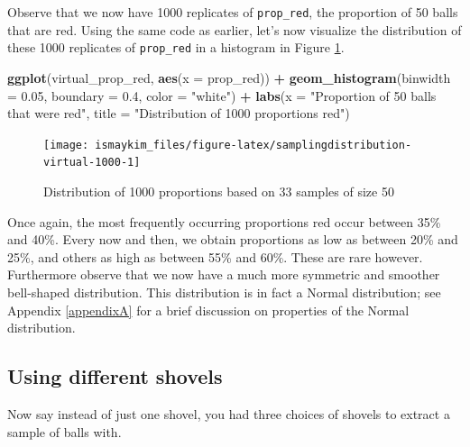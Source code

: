 \documentclass[12pt, krantz2,]{krantz}
\makeatletter
\newenvironment{Shaded}{\begin{snugshade}}{\end{snugshade}}
\newcommand{\DataTypeTok}[1]{\textcolor[rgb]{0.27,0.27,0.27}{#1}}
\newcommand{\FloatTok}[1]{\textcolor[rgb]{0.06,0.06,0.06}{#1}}
\newcommand{\KeywordTok}[1]{\textcolor[rgb]{0.27,0.27,0.27}{\textbf{#1}}}
\newcommand{\NormalTok}[1]{#1}
\newcommand{\OperatorTok}[1]{\textcolor[rgb]{0.43,0.43,0.43}{\textbf{#1}}}
\newcommand{\StringTok}[1]{\textcolor[rgb]{0.5,0.5,0.5}{#1}}
\newenvironment{kframe}{%
\medskip{}
\setlength{\fboxsep}{.8em}
 \def\at@end@of@kframe{}%
 \ifinner\ifhmode%
  \def\at@end@of@kframe{\end{minipage}}%
  \begin{minipage}{\columnwidth}%
 \fi\fi%
 \def\FrameCommand##1{\hskip\@totalleftmargin \hskip-\fboxsep
 \colorbox{shadecolor}{##1}\hskip-\fboxsep
     \hskip-\linewidth \hskip-\@totalleftmargin \hskip\columnwidth}%
 \MakeFramed {\advance\hsize-\width
   \@totalleftmargin\z@ \linewidth\hsize
   \@setminipage}}%
 {\par\unskip\endMakeFramed%
 \at@end@of@kframe}
\renewenvironment{Shaded}{\begin{kframe}}{\end{kframe}}
\makeatother
\begin{document}
Observe that we now have 1000 replicates of \texttt{prop\_red}, the proportion of 50 balls that are red. Using the same code as earlier, let's now visualize the distribution of these 1000 replicates of \texttt{prop\_red} in a histogram in Figure \ref{fig:samplingdistribution-virtual-1000}.

\begin{Shaded}
\begin{Highlighting}[]
\KeywordTok{ggplot}\NormalTok{(virtual_prop_red, }\KeywordTok{aes}\NormalTok{(}\DataTypeTok{x =}\NormalTok{ prop_red)) }\OperatorTok{+}
\StringTok{  }\KeywordTok{geom_histogram}\NormalTok{(}\DataTypeTok{binwidth =} \FloatTok{0.05}\NormalTok{, }\DataTypeTok{boundary =} \FloatTok{0.4}\NormalTok{, }\DataTypeTok{color =} \StringTok{"white"}\NormalTok{) }\OperatorTok{+}
\StringTok{  }\KeywordTok{labs}\NormalTok{(}\DataTypeTok{x =} \StringTok{"Proportion of 50 balls that were red"}\NormalTok{, }
       \DataTypeTok{title =} \StringTok{"Distribution of 1000 proportions red"}\NormalTok{) }
\end{Highlighting}
\end{Shaded}

\begin{figure}

{\centering \texttt{[image: ismaykim\_files/figure-latex/samplingdistribution-virtual-1000-1]} 

}

\caption{Distribution of 1000 proportions based on 33 samples of size 50}\label{fig:samplingdistribution-virtual-1000}
\end{figure}

Once again, the most frequently occurring proportions red occur between 35\% and 40\%. Every now and then, we obtain proportions as low as between 20\% and 25\%, and others as high as between 55\% and 60\%. These are rare however. Furthermore observe that we now have a much more symmetric and smoother bell-shaped distribution. This distribution is in fact a Normal distribution; see Appendix \ref{appendixA} for a brief discussion on properties of the Normal distribution.

\hypertarget{different-shovels}{%
\subsection{Using different shovels}\label{different-shovels}}

Now say instead of just one shovel, you had three choices of shovels to extract a sample of balls with.
\end{document}
